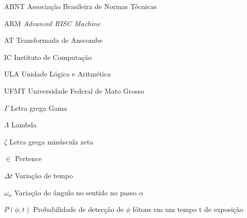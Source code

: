 \begin{siglas}
	\item [ABNT] Associação Brasileira de Normas Técnicas
	\item [ARM] \textit{Advanced RISC Machine}
	\item [AT] Transformada de Anscombe
	\item [IC]Instituto de Computação
	\item [ULA] Unidade Lógica e Aritmética
	\item[UFMT]Universidade Federal de Mato Grosso
\end{siglas}


\begin{simbolos}
	\item[$ \Gamma $] Letra grega Gama
	\item[$ \Lambda $] Lambda
	\item[$ \zeta $] Letra grega minúscula zeta
	\item[$ \in $] Pertence
	\item [$\Delta t$] Variação de tempo	
	\item [$\omega_\alpha$]Variação do ângulo no sentido no passo $\alpha$	%
	\item [$P(\phi,t)$] Probabilidade de detecção de $\phi$ fótons em um tempo t de exposição
\end{simbolos}


\textual
\setcounter{page}{1}


%
%


% 








\postextual





